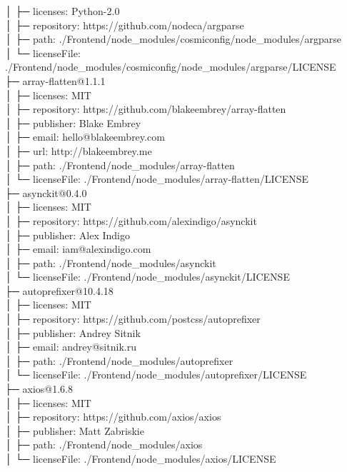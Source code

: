 │  ├─ licenses: Python-2.0\\
│  ├─ repository: https://github.com/nodeca/argparse\\
│  ├─ path: ./Frontend/node\_modules/cosmiconfig/node\_modules/argparse\\
│  └─ licenseFile: ./Frontend/node\_modules/cosmiconfig/node\_modules/argparse/LICENSE\\
├─ array-flatten@1.1.1\\
│  ├─ licenses: MIT\\
│  ├─ repository: https://github.com/blakeembrey/array-flatten\\
│  ├─ publisher: Blake Embrey\\
│  ├─ email: hello@blakeembrey.com\\
│  ├─ url: http://blakeembrey.me\\
│  ├─ path: ./Frontend/node\_modules/array-flatten\\
│  └─ licenseFile: ./Frontend/node\_modules/array-flatten/LICENSE\\
├─ asynckit@0.4.0\\
│  ├─ licenses: MIT\\
│  ├─ repository: https://github.com/alexindigo/asynckit\\
│  ├─ publisher: Alex Indigo\\
│  ├─ email: iam@alexindigo.com\\
│  ├─ path: ./Frontend/node\_modules/asynckit\\
│  └─ licenseFile: ./Frontend/node\_modules/asynckit/LICENSE\\
├─ autoprefixer@10.4.18\\
│  ├─ licenses: MIT\\
│  ├─ repository: https://github.com/postcss/autoprefixer\\
│  ├─ publisher: Andrey Sitnik\\
│  ├─ email: andrey@sitnik.ru\\
│  ├─ path: ./Frontend/node\_modules/autoprefixer\\
│  └─ licenseFile: ./Frontend/node\_modules/autoprefixer/LICENSE\\
├─ axios@1.6.8\\
│  ├─ licenses: MIT\\
│  ├─ repository: https://github.com/axios/axios\\
│  ├─ publisher: Matt Zabriskie\\
│  ├─ path: ./Frontend/node\_modules/axios\\
│  └─ licenseFile: ./Frontend/node\_modules/axios/LICENSE\\
